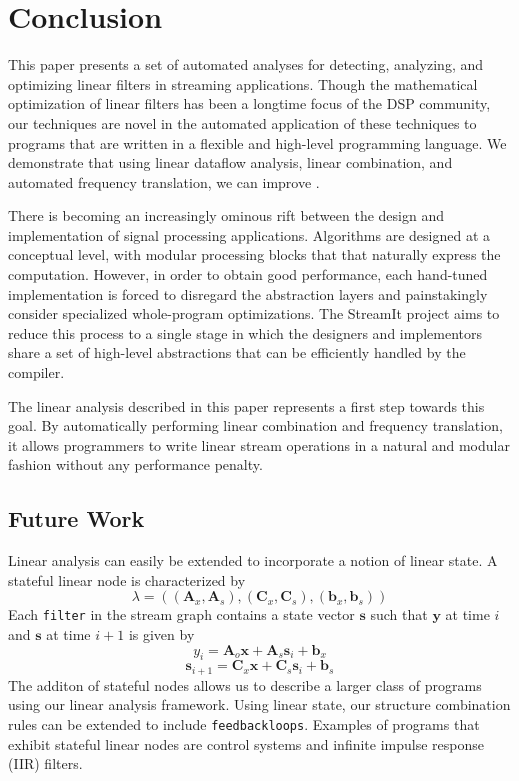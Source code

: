 \section{Conclusion}
\label{sec:conclusion}

This paper presents a set of automated analyses for detecting,
analyzing, and optimizing linear filters in streaming applications.
Though the mathematical optimization of linear filters has been a
longtime focus of the DSP community, our techniques are novel in the
automated application of these techniques to programs that are written
in a flexible and high-level programming language.  We demonstrate
that using linear dataflow analysis, linear combination, and automated
frequency translation, we can improve .

There is becoming an increasingly ominous rift between the design and
implementation of signal processing applications.  Algorithms are
designed at a conceptual level, with modular processing blocks that
that naturally express the computation.  However, in order to obtain
good performance, each hand-tuned implementation is forced to
disregard the abstraction layers and painstakingly consider
specialized whole-program optimizations.  The StreamIt project aims to
reduce this process to a single stage in which the designers and
implementors share a set of high-level abstractions that can be
efficiently handled by the compiler.  

The linear analysis described in this paper represents a first step
towards this goal.  By automatically performing linear combination and
frequency translation, it allows programmers to write linear stream
operations in a natural and modular fashion without any performance
penalty.

\subsection{Future Work}

Linear analysis can easily be extended to incorporate a notion of
linear state.  A stateful linear node is characterized by
\begin{equation} \nonumber
\lambda=(({\mathbf A}_x, {\mathbf A}_s), ({\mathbf C}_x, {\mathbf C}_s), 
({\mathbf b}_x, {\mathbf b}_s))
\end{equation}
Each {\tt filter} in the stream graph contains a state vector
${\mathbf s}$ such that ${\mathbf y}$ at time $i$ and ${\mathbf s}$ at
time $i+1$ is given by
\begin{equation} \nonumber
y_i={\mathbf A}_o{\mathbf x} + {\mathbf A}_s{\mathbf s}_i + {\mathbf b}_x
\end{equation}
\begin{equation} \nonumber
{\mathbf s}_{i+1}={\mathbf C}_x{\mathbf x} + {\mathbf C}_s{\mathbf s}_i + {\mathbf b}_s
\end{equation}
The additon of stateful nodes allows us to describe a larger class of programs 
using our linear analysis framework.
Using linear state, our structure combination rules can be extended to include {\tt feedbackloops}.
Examples of programs that exhibit stateful linear nodes are control systems
and infinite impulse response (IIR) filters.

